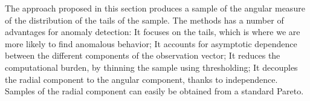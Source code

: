 The approach proposed in this section produces a sample of the angular measure of
    the distribution of the tails of the sample. The methods has a number of 
    advantages for anomaly detection: It focuses on the tails, which is where we 
    are more likely to find anomalous behavior;  It accounts for asymptotic 
    dependence between the different components of the observation vector; It 
    reduces the computational burden, by thinning the sample using thresholding; 
    It decouples the radial component to the angular component, thanks to 
    independence. Samples of the radial component can easily be obtained from a 
    standard Pareto.

